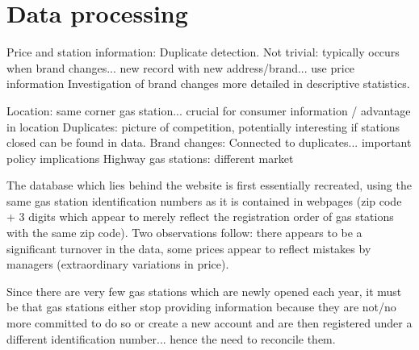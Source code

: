 \documentclass[11pt]{article}
\begin{document}
\newpage



\newpage

\appendix

\section{Data processing}

Price and station information: Duplicate detection. Not trivial: typically occurs when brand changes... new record with new address/brand... use price information
Investigation of brand changes more detailed in descriptive statistics.

Location: same corner gas station... crucial for consumer information / advantage in location
Duplicates: picture of competition, potentially interesting if stations closed can be found in data.
Brand changes: Connected to duplicates... important policy implications
Highway gas stations: different market

The database which lies behind the website is first essentially recreated, using the same gas station identification numbers as it is contained in webpages (zip code + 3 digits which appear to merely reflect the registration order of gas stations with the same zip code). Two observations follow: there appears to be a significant turnover in the data, some prices appear to reflect mistakes by managers (extraordinary variations in price).

Since there are very few gas stations which are newly opened each year, it must be that gas stations either stop providing information because they are not/no more committed to do so or create a new account and are then registered under a different identification number... hence the need to reconcile them.
\end{document}

